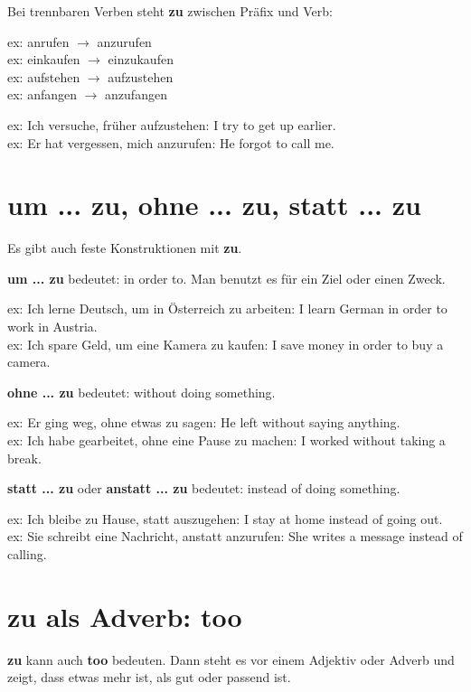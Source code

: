 \documentclass[a4paper,12pt]{article}
\begin{document}
        Bei trennbaren Verben steht \textbf{zu} zwischen Präfix und Verb:
        
        ex: anrufen $\rightarrow$ anzurufen\\
        ex: einkaufen $\rightarrow$ einzukaufen\\
        ex: aufstehen $\rightarrow$ aufzustehen\\
        ex: anfangen $\rightarrow$ anzufangen
        
        ex: Ich versuche, früher aufzustehen: I try to get up earlier.\\
        ex: Er hat vergessen, mich anzurufen: He forgot to call me.
    
    
    \section{um ... zu, ohne ... zu, statt ... zu}
        
        Es gibt auch feste Konstruktionen mit \textbf{zu}.
        
        \textbf{um ... zu} bedeutet: in order to. Man benutzt es für ein Ziel oder einen Zweck.
        
        ex: Ich lerne Deutsch, um in Österreich zu arbeiten: I learn German in order to work in Austria.\\
        ex: Ich spare Geld, um eine Kamera zu kaufen: I save money in order to buy a camera.
        
        \textbf{ohne ... zu} bedeutet: without doing something.
        
        ex: Er ging weg, ohne etwas zu sagen: He left without saying anything.\\
        ex: Ich habe gearbeitet, ohne eine Pause zu machen: I worked without taking a break.
        
        \textbf{statt ... zu} oder \textbf{anstatt ... zu} bedeutet: instead of doing something.
        
        ex: Ich bleibe zu Hause, statt auszugehen: I stay at home instead of going out.\\
        ex: Sie schreibt eine Nachricht, anstatt anzurufen: She writes a message instead of calling.
    
    
    \section{zu als Adverb: too}
        
        \textbf{zu} kann auch \textbf{too} bedeuten. Dann steht es vor einem Adjektiv oder Adverb und zeigt, dass etwas mehr ist, als gut oder passend ist.
        
\end{document}
